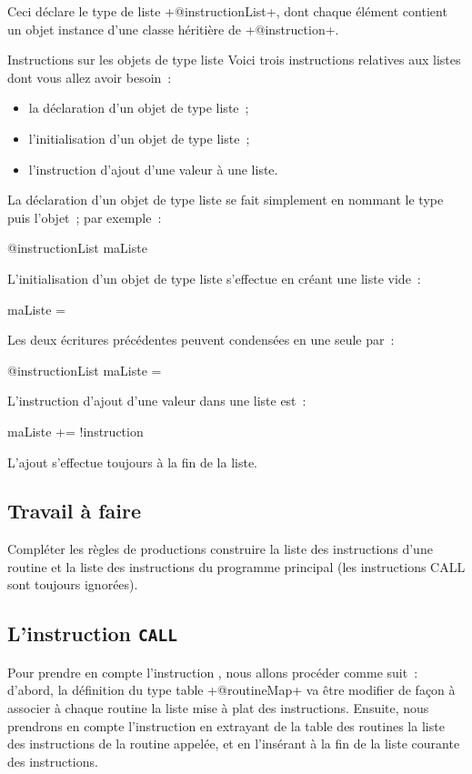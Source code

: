 Ceci déclare le type de liste \ggst+@instructionList+, dont chaque élément contient un objet instance d'une classe héritière de \ggst+@instruction+.

Instructions sur les objets de type liste
Voici trois instructions relatives aux listes dont vous allez avoir besoin~:
\begin{itemize}
  \item la déclaration d'un objet de type liste~;
  \item l'initialisation d'un objet de type liste~;
  \item l'instruction d'ajout d'une valeur à une liste.
\end{itemize}

La déclaration d'un objet de type liste se fait simplement en nommant le type puis l'objet~; par exemple~:
\begin{galgas3}
@instructionList maListe
\end{galgas3}

L'initialisation d'un objet de type liste s'effectue en créant une liste vide~:
\begin{galgas3}
maListe = {}
\end{galgas3}

Les deux écritures précédentes peuvent condensées en une seule par~:
\begin{galgas3}
@instructionList maListe = {}
\end{galgas3}

L'instruction d'ajout d'une valeur dans une liste est~:
\begin{galgas3}
maListe += !instruction
\end{galgas3}
L'ajout s'effectue toujours à la fin de la liste.

\subsection{Travail à faire}
Compléter les règles de productions construire la liste des instructions d'une routine et la liste des instructions du programme principal (les instructions CALL sont toujours ignorées).

\subsection{L'instruction \texttt{CALL}}
Pour prendre en compte l’instruction , nous allons procéder comme suit~: d’abord, la définition du type table \ggst+@routineMap+ va être modifier de façon à associer à chaque routine la liste mise à plat des instructions. Ensuite, nous prendrons en compte l’instruction  en extrayant de la table des routines la liste des instructions de la routine appelée, et en l’insérant à la fin de la liste courante des instructions.

